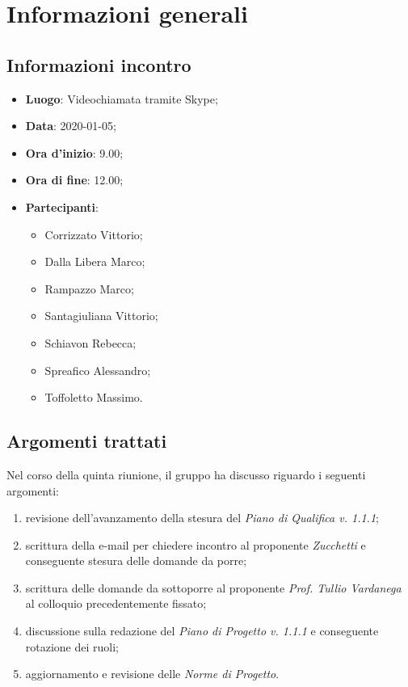 \section{Informazioni generali}
    \subsection{Informazioni incontro}
        \begin{itemize}
            \item \textbf{Luogo}: Videochiamata tramite Skype;
            \item \textbf{Data}: 2020-01-05;
            \item \textbf{Ora d'inizio}: 9.00;
            \item \textbf{Ora di fine}: 12.00;
            \item \textbf{Partecipanti}: \begin{itemize}
                \item Corrizzato Vittorio;
                \item Dalla Libera Marco;
                \item Rampazzo Marco;
                \item Santagiuliana Vittorio;
                \item Schiavon Rebecca;
                \item Spreafico Alessandro;
                \item Toffoletto Massimo.
            \end{itemize}
        \end{itemize}
    \subsection{Argomenti trattati}
        Nel corso della quinta riunione, il gruppo ha discusso riguardo i seguenti argomenti:
        \begin{enumerate}
            \item revisione dell'avanzamento della stesura del \textit{Piano di Qualifica v. 1.1.1}; 
            \item scrittura della e-mail per chiedere incontro al proponente \textit{Zucchetti} e conseguente stesura delle domande da porre;
            \item scrittura delle domande da sottoporre al proponente \textit{Prof. Tullio Vardanega} al colloquio precedentemente fissato;
            \item discussione sulla redazione del \textit{Piano di Progetto v. 1.1.1} e conseguente rotazione dei ruoli;
            \item aggiornamento e revisione delle \textit{Norme di Progetto}.
        \end{enumerate}
